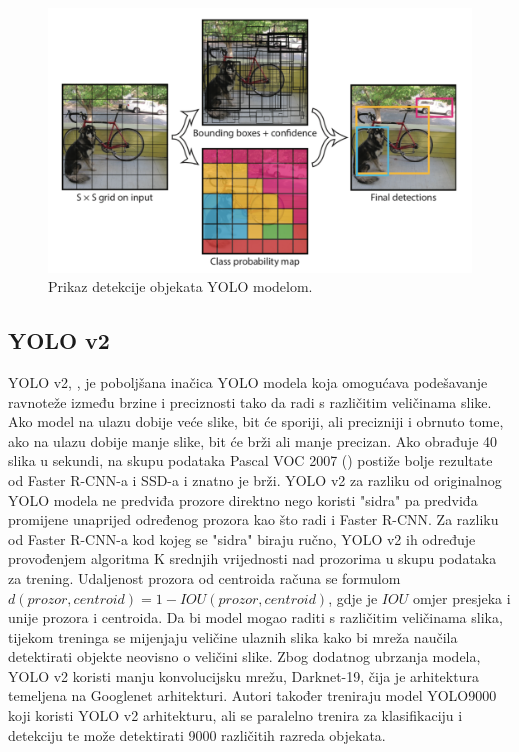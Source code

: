  \begin{figure}
	\centering
	\includegraphics[scale=0.8]{img/yolo_detekcija.png}
	\caption{Prikaz detekcije objekata YOLO modelom.}
	\label{yolo_detekcija}
\end{figure}

\subsection{YOLO v2}
YOLO v2, \cite{DBLP:journals/corr/RedmonF16}, je poboljšana inačica YOLO modela koja omogućava podešavanje ravnoteže između brzine i preciznosti tako da radi s različitim veličinama slike. Ako model na ulazu dobije veće slike, bit će sporiji, ali precizniji i obrnuto tome, ako na ulazu dobije manje slike, bit će brži ali manje precizan. Ako obrađuje 40 slika u sekundi, na skupu podataka Pascal VOC 2007 (\cite{pascal-voc-2007}) postiže bolje rezultate od Faster R-CNN-a i SSD-a i znatno je brži. YOLO v2 za razliku od originalnog YOLO modela ne predviđa prozore direktno nego koristi "sidra" pa predviđa promijene unaprijed određenog prozora kao što radi i Faster R-CNN. Za razliku od Faster R-CNN-a kod kojeg se "sidra" biraju ručno, YOLO v2 ih određuje provođenjem algoritma K srednjih vrijednosti nad prozorima u skupu podataka za trening. Udaljenost prozora od centroida računa se formulom $d(prozor, centroid) = 1 - IOU(prozor, centroid)$, gdje je $IOU$ omjer presjeka i unije prozora i centroida.
Da bi model mogao raditi s različitim veličinama slika, tijekom treninga se mijenjaju veličine ulaznih slika kako bi mreža naučila detektirati objekte neovisno o veličini slike.  
Zbog dodatnog ubrzanja modela, YOLO v2 koristi manju konvolucijsku mrežu, Darknet-19, čija je arhitektura temeljena na Googlenet arhitekturi. 
Autori također treniraju model YOLO9000 koji koristi YOLO v2 arhitekturu, ali se paralelno trenira za klasifikaciju i detekciju te može detektirati 9000 različitih razreda objekata.

